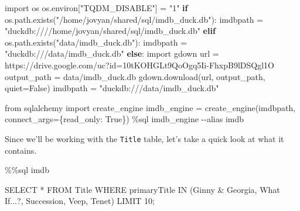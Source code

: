 \documentclass[
  letterpaper,
  DIV=11,
  numbers=noendperiod]{scrreprt}
\newenvironment{Shaded}{\begin{snugshade}}{\end{snugshade}}
\newcommand{\ControlFlowTok}[1]{\textcolor[rgb]{0.00,0.23,0.31}{\textbf{#1}}}
\newcommand{\DecValTok}[1]{\textcolor[rgb]{0.68,0.00,0.00}{#1}}
\newcommand{\ImportTok}[1]{\textcolor[rgb]{0.00,0.46,0.62}{#1}}
\newcommand{\NormalTok}[1]{\textcolor[rgb]{0.00,0.23,0.31}{#1}}
\newcommand{\OperatorTok}[1]{\textcolor[rgb]{0.37,0.37,0.37}{#1}}
\newcommand{\StringTok}[1]{\textcolor[rgb]{0.13,0.47,0.30}{#1}}
\newcommand{\VariableTok}[1]{\textcolor[rgb]{0.07,0.07,0.07}{#1}}
\begin{document}
\begin{Shaded}
\begin{Highlighting}[]
\ImportTok{import}\NormalTok{ os}
\NormalTok{os.environ[}\StringTok{"TQDM\_DISABLE"}\NormalTok{] }\OperatorTok{=} \StringTok{"1"}
\ControlFlowTok{if}\NormalTok{ os.path.exists(}\StringTok{"/home/jovyan/shared/sql/imdb\_duck.db"}\NormalTok{):}
\NormalTok{    imdbpath }\OperatorTok{=} \StringTok{"duckdb:////home/jovyan/shared/sql/imdb\_duck.db"}
\ControlFlowTok{elif}\NormalTok{ os.path.exists(}\StringTok{"data/imdb\_duck.db"}\NormalTok{):}
\NormalTok{    imdbpath }\OperatorTok{=}  \StringTok{"duckdb:///data/imdb\_duck.db"}
\ControlFlowTok{else}\NormalTok{:}
    \ImportTok{import}\NormalTok{ gdown}
\NormalTok{    url }\OperatorTok{=} \StringTok{\textquotesingle{}https://drive.google.com/uc?id=10tKOHGLt9QoOgq5Ii{-}FhxpB9lDSQgl1O\textquotesingle{}}
\NormalTok{    output\_path }\OperatorTok{=} \StringTok{\textquotesingle{}data/imdb\_duck.db\textquotesingle{}}
\NormalTok{    gdown.download(url, output\_path, quiet}\OperatorTok{=}\VariableTok{False}\NormalTok{)}
\NormalTok{    imdbpath }\OperatorTok{=} \StringTok{"duckdb:///data/imdb\_duck.db"}
\end{Highlighting}
\end{Shaded}

\begin{Shaded}
\begin{Highlighting}[]
\ImportTok{from}\NormalTok{ sqlalchemy }\ImportTok{import}\NormalTok{ create\_engine}
\NormalTok{imdb\_engine }\OperatorTok{=}\NormalTok{ create\_engine(imdbpath, connect\_args}\OperatorTok{=}\NormalTok{\{}\StringTok{\textquotesingle{}read\_only\textquotesingle{}}\NormalTok{: }\VariableTok{True}\NormalTok{\})}
\OperatorTok{\%}\NormalTok{sql imdb\_engine }\OperatorTok{{-}{-}}\NormalTok{alias imdb}
\end{Highlighting}
\end{Shaded}

Since we'll be working with the \texttt{Title} table, let's take a quick
look at what it contains.

\begin{Shaded}
\begin{Highlighting}[]
\OperatorTok{\%\%}\NormalTok{sql imdb }
    
\NormalTok{SELECT }\OperatorTok{*}
\NormalTok{FROM Title}
\NormalTok{WHERE primaryTitle IN (}\StringTok{\textquotesingle{}Ginny \& Georgia\textquotesingle{}}\NormalTok{, }\StringTok{\textquotesingle{}What If...?\textquotesingle{}}\NormalTok{, }\StringTok{\textquotesingle{}Succession\textquotesingle{}}\NormalTok{, }\StringTok{\textquotesingle{}Veep\textquotesingle{}}\NormalTok{, }\StringTok{\textquotesingle{}Tenet\textquotesingle{}}\NormalTok{)}
\NormalTok{LIMIT }\DecValTok{10}\OperatorTok{;}
\end{Highlighting}
\end{Shaded}
\end{document}
